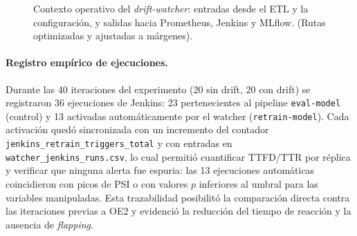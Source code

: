 \begin{figure}[htbp]
{
}
\caption{Contexto operativo del \textit{drift-watcher}: entradas desde el ETL y la configuración, y salidas hacia Prometheus, Jenkins y MLflow. (Rutas optimizadas y ajustadas a márgenes).}
\label{fig:oe2-context-final}
\end{figure}



\paragraph{Registro empírico de ejecuciones.}
Durante las 40 iteraciones del experimento (20 sin drift, 20 con drift) se registraron 36 ejecuciones de Jenkins: 23 pertenecientes al pipeline \texttt{eval-model} (control) y 13 activadas automáticamente por el watcher (\texttt{retrain-model}). Cada activación quedó sincronizada con un incremento del contador \texttt{jenkins\_retrain\_triggers\_total} y con entradas en \texttt{watcher\_jenkins\_runs.csv}, lo cual permitió cuantificar TTFD/TTR por réplica y verificar que ninguna alerta fue espuria: las 13 ejecuciones automáticas coincidieron con picos de PSI o con valores \(p\) inferiores al umbral para las variables manipuladas. Esta trazabilidad posibilitó la comparación directa contra las iteraciones previas a OE2 y evidenció la reducción del tiempo de reacción y la ausencia de \textit{flapping}.

